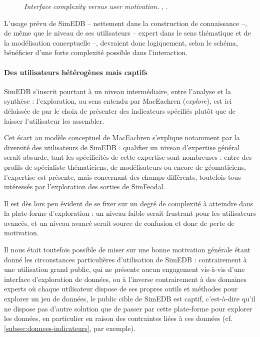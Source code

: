 \begin{figure}[H]
\begin{minipage}[t]{.46\linewidth}
\caption{\og \textit{Interface complexity versus user motivation. }\fg{}, \cite[79]{roth_interactive_2013}.}
\label{fig:interface-complexity}
\end{minipage}
\end{figure}

L'usage prévu de SimEDB -- nettement dans la construction de connaissance --, de même que le \og niveau\fg{} de ses utilisateurs -- expert dans le sens thématique et de la modélisation conceptuelle --, devraient donc logiquement, selon le schéma, bénéficier d'une forte complexité possible dans l'interaction.

\paragraph*{Des utilisateurs hétérogènes mais captifs}

SimEDB s'inscrit pourtant à un niveau intermédiaire, entre l'analyse et la synthèse : l'exploration, au sens entendu par MacEachren (\textit{explore}), est ici délaissée de par le choix de présenter des indicateurs spécifiés plutôt que de laisser l'utilisateur les assembler.

Cet écart au modèle conceptuel de MacEachren s'explique notamment par la diversité des utilisateurs de SimEDB : qualifier un niveau d'expertise général serait absurde, tant les spécificités de cette expertise sont nombreuses : entre des profils de spécialiste thématiciens, de modélisateurs ou encore de géomaticiens, l'expertise est présente, mais concernant des champs différents, toutefois tous intéressés par l'exploration des sorties de SimFeodal.

Il est dès lors peu évident de se fixer sur un degré de complexité à atteindre dans la plate-forme d'exploration : un niveau faible serait frustrant pour les utilisateurs avancés, et un niveau avancé serait source de confusion et donc de perte de motivation.

Il nous était toutefois possible de miser sur une bonne motivation générale étant donné les circonstances particulières d'utilisation de SimEDB : contrairement à une utilisation grand public, qui ne présente aucun engagement vis-à-vis d'une interface d'exploration de données, ou à l'inverse contrairement à des domaines experts où chaque utilisateur dispose de ses propres outils et méthodes pour explorer un jeu de données, le public cible de SimEDB est \og captif\fg{}, c'est-à-dire qu'il ne dispose pas d'autre solution que de passer par cette plate-forme pour explorer les données, en particulier en raison des contraintes liées à ces données (cf. \cref{subsec:donnees-indicateurs},  par exemple).


